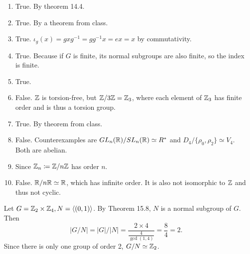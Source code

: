\documentclass[12pt]{article}
\begin{document}
\begin{problem}[4.23]
\begin{enumerate}[label=\alph*)]
	\item True. By theorem 14.4.
	\item True. By a theorem from class.
	\item True. $\iota_g(x)= gxg^{-1} = g g^{-1} x = ex=x$ by commutativity.
	\item True. Because if $ G$ is finite, its normal subgroups are also finite, so the index is finite.
	\item True. 
	\item False.  $ \mathbb{Z}$ is torsion-free, but $ \mathbb{Z} / 3 \mathbb{Z} = \mathbb{Z}_3$, where each element of $ \mathbb{Z}_3$ has finite order and is thus a torsion group.
	\item True. By theorem from class.
	\item False. Counterexamples are $ GL_n(\mathbb{R}) / SL_n(\mathbb{R}) \simeq R^* $ and $ D_4 / \{\rho_0,\rho_2\} \simeq V_4 $. Both are abelian.
	\item Since $ \mathbb{Z}_n \coloneqq \mathbb{Z} / n \mathbb{Z}$ has order $ n$.
	\item False.  $ \mathbb{R} / n \mathbb{R} \simeq \mathbb{R}$, which has infinite order. It is also not isomorphic to $ \mathbb{Z}$ and thus not cyclic.
\end{enumerate}
\end{problem}

\begin{problem}[15.1]
	Let $ G= \mathbb{Z}_2 \times \mathbb{Z}_4, N = \langle (0,1) \rangle$. By Theorem 15.8, $ N$ is a normal subgroup of $ G$. Then
	\[
	|G /N| = |G| / |N| = \frac{2 \times 4}{\frac{4}{\gcd ( 1,4) } } = \frac{8}{4}= 2
	.\] 
	Since there is only one group of order 2, $ G / N \simeq \mathbb{Z}_2$.
\end{problem}
\end{document}
